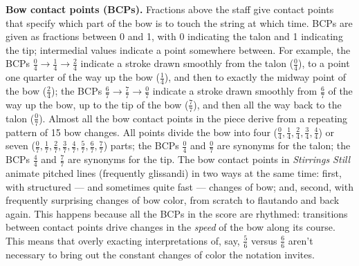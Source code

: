 \textbf{Bow contact points (BCPs).} Fractions above the staff give contact points that
specify which part of the bow is to touch the string at which time. BCPs are given as
fractions between 0 and 1, with 0 indicating the talon and 1 indicating the tip;
intermedial values indicate a point somewhere between. For example, the BCPs $\frac{0}{4}
\longrightarrow \frac{1}{4} \longrightarrow \frac{2}{4}$ indicate a stroke drawn smoothly
from the talon ($\frac{0}{4}$), to a point one quarter of the way up the bow
($\frac{1}{4}$), and then to exactly the midway point of the bow ($\frac{2}{4}$); the
BCPs $\frac{6}{7} \longrightarrow \frac{7}{7} \longrightarrow \frac{0}{7}$ indicate a
stroke drawn smoothly from $\frac{6}{7}$ of the way up the bow, up to the tip of the bow
($\frac{7}{7}$), and then all the way back to the talon ($\frac{0}{7}$). Almost all the
bow contact points in the piece derive from a repeating pattern of 15 bow changes. All
points divide the bow into four ($\frac{0}{4}, \frac{1}{4}, \frac{2}{4}, \frac{3}{4},
\frac{4}{4}$) or seven ($\frac{0}{7}, \frac{1}{7}, \frac{2}{7}, \frac{3}{7}, \frac{4}{7},
\frac{5}{7}, \frac{6}{7}, \frac{7}{7}$) parts; the BCPs $\frac{0}{4}$ and $\frac{0}{7}$
are synonyms for the talon; the BCPs $\frac{4}{4}$ and $\frac{7}{7}$ are synonyms for the
tip. The bow contact points in \textit{Stirrings Still} animate pitched lines (frequently
glissandi) in two ways at the same time: first, with structured --- and sometimes quite
fast --- changes of bow; and, second, with frequently surprising changes of bow color,
from scratch to flautando and back again. This happens because all the BCPs in the score
are rhythmed: transitions between contact points drive changes in the \textit{speed} of
the bow along its course. This means that overly exacting interpretations of, say,
$\frac{5}{6}$ versus $\frac{6}{6}$ aren't necessary to bring out the constant changes of
color the notation invites.

